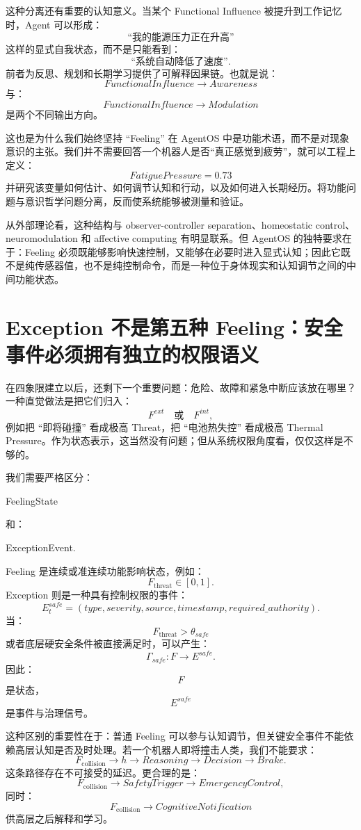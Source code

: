 这种分离还有重要的认知意义。当某个 Functional Influence 被提升到工作记忆时，Agent 可以形成：
\[
\text{``我的能源压力正在升高''}
\]
这样的显式自我状态，而不是只能看到：
\[
\text{``系统自动降低了速度''}.
\]
前者为反思、规划和长期学习提供了可解释因果链。也就是说：
\[
FunctionalInfluence
\rightarrow
Awareness
\]
与：
\[
FunctionalInfluence
\rightarrow
Modulation
\]
是两个不同输出方向。

这也是为什么我们始终坚持 ``Feeling'' 在 AgentOS 中是功能术语，而不是对现象意识的主张。我们并不需要回答一个机器人是否``真正感觉到疲劳''，就可以工程上定义：
\[
FatiguePressure=0.73
\]
并研究该变量如何估计、如何调节认知和行动，以及如何进入长期经历。将功能问题与意识哲学问题分离，反而使系统能够被测量和验证。

从外部理论看，这种结构与 observer-controller separation、homeostatic control、neuromodulation 和 affective computing 有明显联系。但 AgentOS 的独特要求在于：Feeling 必须既能够影响快速控制，又能够在必要时进入显式认知；因此它既不是纯传感器值，也不是纯控制命令，而是一种位于身体现实和认知调节之间的中间功能状态。

\section{Exception 不是第五种 Feeling：安全事件必须拥有独立的权限语义}
\label{sec:exception-not-feeling}

在四象限建立以后，还剩下一个重要问题：危险、故障和紧急中断应该放在哪里？一种直觉做法是把它们归入：
\[
F^{ext}
\quad\text{或}\quad
F^{int},
\]
例如把 ``即将碰撞'' 看成极高 Threat，把 ``电池热失控'' 看成极高 Thermal Pressure。作为状态表示，这当然没有问题；但从系统权限角度看，仅仅这样是不够的。

我们需要严格区分：
\begin{statementbox}
FeelingState
\end{statementbox}
和：
\begin{statementbox}
ExceptionEvent.
\end{statementbox}
Feeling 是连续或准连续功能影响状态，例如：
\[
F_{\mathrm{threat}}\in[0,1].
\]
Exception 则是一种具有控制权限的事件：
\[
E^{safe}_t
=
(
type,
severity,
source,
timestamp,
required\_authority
).
\]
当：
\[
F_{\mathrm{threat}}>\theta_{safe}
\]
或者底层硬安全条件被直接满足时，可以产生：
\[
\Gamma_{safe}:
F
\rightarrow
E^{safe}.
\]
因此：
\[
F
\]
是状态，
\[
E^{safe}
\]
是事件与治理信号。

这种区别的重要性在于：普通 Feeling 可以参与认知调节，但关键安全事件不能依赖高层认知是否及时处理。若一个机器人即将撞击人类，我们不能要求：
\[
F_{\mathrm{collision}}
\rightarrow
h
\rightarrow
Reasoning
\rightarrow
Decision
\rightarrow
Brake.
\]
这条路径存在不可接受的延迟。更合理的是：
\[
F_{\mathrm{collision}}
\rightarrow
SafetyTrigger
\rightarrow
EmergencyControl,
\]
同时：
\[
F_{\mathrm{collision}}
\rightarrow
CognitiveNotification
\]
供高层之后解释和学习。


